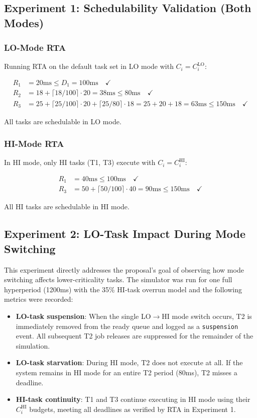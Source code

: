 \documentclass[conference]{IEEEtran}
\begin{document}
\subsection{Experiment 1: Schedulability Validation (Both Modes)}

\subsubsection{LO-Mode RTA}
Running RTA on the default task set in LO mode with $C_i = C_i^{\text{LO}}$:

\begin{align}
  R_1 &= 20 \text{ms} \leq D_1 = 100\text{ms} \quad \checkmark \\
  R_2 &= 18 + \lceil 18/100 \rceil \cdot 20 = 38\text{ms} \leq 80\text{ms} \quad \checkmark \\
  R_3 &= 25 + \lceil 25/100 \rceil \cdot 20 + \lceil 25/80 \rceil \cdot 18 = 25 + 20 + 18 = 63\text{ms} \leq 150\text{ms} \quad \checkmark
\end{align}

All tasks are schedulable in LO mode.

\subsubsection{HI-Mode RTA}
In HI mode, only HI tasks (T1, T3) execute with $C_i = C_i^{\text{HI}}$:

\begin{align}
  R_1 &= 40\text{ms} \leq 100\text{ms} \quad \checkmark \\
  R_3 &= 50 + \lceil 50/100 \rceil \cdot 40 = 90\text{ms} \leq 150\text{ms} \quad \checkmark
\end{align}

All HI tasks are schedulable in HI mode.

\subsection{Experiment 2: LO-Task Impact During Mode Switching}

This experiment directly addresses the proposal's goal of observing how mode switching affects lower-criticality tasks. The simulator was run for one full hyperperiod (1200ms) with the 35\% HI-task overrun model and the following metrics were recorded:

\begin{itemize}
  \item \textbf{LO-task suspension}: When the single LO$\rightarrow$HI mode switch occurs, T2 is immediately removed from the ready queue and logged as a \texttt{suspension} event. All subsequent T2 job releases are suppressed for the remainder of the simulation.
  \item \textbf{LO-task starvation}: During HI mode, T2 does not execute at all. If the system remains in HI mode for an entire T2 period (80ms), T2 misses a deadline.
  \item \textbf{HI-task continuity}: T1 and T3 continue executing in HI mode using their $C_i^{\text{HI}}$ budgets, meeting all deadlines as verified by RTA in Experiment 1.
\end{itemize}
\end{document}
